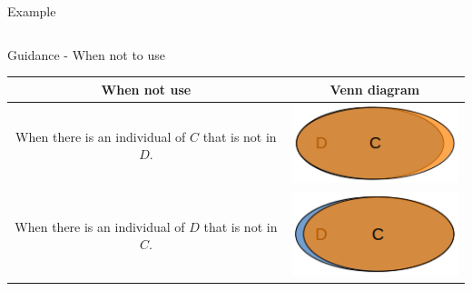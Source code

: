 \documentclass{beamer}
\begin{document}
{\begin{block}{Example}
\begin{table}
\begin{center}
\begin{small}
\begin{tabular}{|c|c|c|}
						\hline						 				  
					\end{tabular}
				\end{small}
			\end{center}
		\end{table}
	\end{block}
	\begin{block}{Guidance - When not to use}
		\begin{table} 
			\begin{center} 
				\begin{small}
					\begin{tabular}{|c|c|} 
						\hline					
						\textbf{When not use}&\textbf{Venn diagram}\\
						\hline 
						\begin{minipage}{7.5cm}
							When there is an individual of $C$ that is not in $D$.
						\end{minipage}									
						& 
						\begin{minipage}{3cm}
							\includegraphics[trim = 0mm 0mm 0mm 0mm, clip, scale=0.4]{./images/IndividualOfCnotInD.png}
						\end{minipage}										
						\\
						\hline 
						\begin{minipage}{7.5cm}
							When there is an individual of $D$ that is not in $C$.
						\end{minipage}									
						& 
						\begin{minipage}{3cm}
							\includegraphics[trim = 0mm 1mm 0mm 1mm, clip, scale=0.4]{./images/IndividualOfDnotInC.png}
						\end{minipage}										
						\\					
						\hline						 				  
					\end{tabular}
				\end{small}
			\end{center}
		\end{table}
	\end{block}
}
\end{document}
